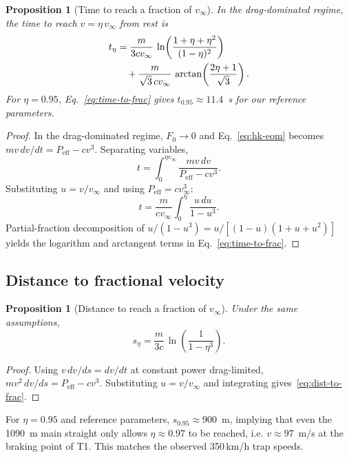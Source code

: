 \documentclass[11pt,twocolumn]{article}
\newtheorem{proposition}[theorem]{Proposition}
\theoremstyle{definition}
\theoremstyle{remark}
\begin{document}
\begin{proposition}[Time to reach a fraction of $v_\infty$]
\label{prop:time-to-frac}
In the drag-dominated regime, the time to reach $v = \eta\, v_\infty$ from
rest is
\begin{align}
  t_\eta &= \frac{m}{3 c v_\infty}\,
  \ln\!\left(\frac{1+\eta+\eta^2}{(1-\eta)^2}\right) \notag\\
  &\quad + \frac{m}{\sqrt{3}\, c v_\infty}\,
  \arctan\!\left(\frac{2\eta+1}{\sqrt{3}}\right).
  \label{eq:time-to-frac}
\end{align}
For $\eta = 0.95$, Eq.~\eqref{eq:time-to-frac} gives $t_{0.95} \approx 11.4$~s for our reference parameters.
\end{proposition}

\begin{proof}
In the drag-dominated regime, $F_0 \to 0$ and Eq.~\eqref{eq:hk-eom} becomes
$m v\, dv/dt = P_{\mathrm{eff}} - c v^3$. Separating variables,
\[
  t = \int_0^{\eta v_\infty} \frac{m v\,dv}{P_{\mathrm{eff}} - c v^3}.
\]
Substituting $u = v/v_\infty$ and using
$P_{\mathrm{eff}} = c v_\infty^3$:
\[
  t = \frac{m}{c v_\infty}\int_0^\eta \frac{u\, du}{1 - u^3}.
\]
Partial-fraction decomposition of $u/(1-u^3) = u/[(1-u)(1+u+u^2)]$ yields
the logarithm and arctangent terms in Eq.~\eqref{eq:time-to-frac}.
\end{proof}

\subsection{Distance to fractional velocity}

\begin{proposition}[Distance to reach a fraction of $v_\infty$]
\label{prop:dist-to-frac}
Under the same assumptions,
\begin{equation}
  s_\eta = \frac{m}{3 c}\,
  \ln\!\left(\frac{1}{1 - \eta^3}\right).
  \label{eq:dist-to-frac}
\end{equation}
\end{proposition}

\begin{proof}
Using $v\,dv/ds = dv/dt$ at constant power drag-limited,
$m v^2\, dv/ds = P_{\mathrm{eff}} - c v^3$. Substituting $u = v/v_\infty$
and integrating gives~\eqref{eq:dist-to-frac}.
\end{proof}

\noindent
For $\eta = 0.95$ and reference parameters, $s_{0.95} \approx 900$~m,
implying that even the 1090~m main straight only allows $\eta \approx 0.97$
to be reached, i.e. $v \approx 97$~m/s at the braking point of T1. This
matches the observed 350\,km/h trap speeds.
\end{document}
